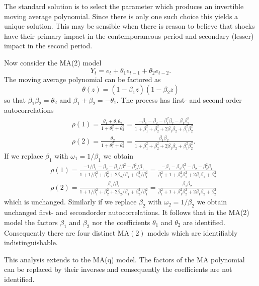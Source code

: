 \documentclass[10pt]{article}
\begin{document}
The standard solution is to select the parameter which produces an invertible moving average polynomial. Since there is only one such choice this yields a unique solution. This may be sensible when there is reason to believe that shocks have their primary impact in the contemporaneous period and secondary (lesser) impact in the second period.

Now consider the MA(2) model
$$
Y_{t}=e_{t}+\theta_{1} e_{t-1}+\theta_{2} e_{t-2} .
$$
The moving average polynomial can be factored as
$$
\theta(z)=\left(1-\beta_{1} z\right)\left(1-\beta_{2} z\right)
$$
so that $\beta_{1} \beta_{2}=\theta_{2}$ and $\beta_{1}+\beta_{2}=-\theta_{1}$. The process has first- and second-order autocorrelations
$$
\begin{aligned}
&\rho(1)=\frac{\theta_{1}+\theta_{1} \theta_{2}}{1+\theta_{1}^{2}+\theta_{2}^{2}}=\frac{-\beta_{1}-\beta_{2}-\beta_{1}^{2} \beta_{2}-\beta_{1} \beta_{2}^{2}}{1+\beta_{1}^{2}+\beta_{2}^{2}+2 \beta_{1} \beta_{2}+\beta_{1}^{2} \beta_{2}^{2}} \\
&\rho(2)=\frac{\theta_{2}}{1+\theta_{1}^{2}+\theta_{2}^{2}}=\frac{\beta_{1} \beta_{2}}{1+\beta_{1}^{2}+\beta_{2}^{2}+2 \beta_{1} \beta_{2}+\beta_{1}^{2} \beta_{2}^{2}} .
\end{aligned}
$$
If we replace $\beta_{1}$ with $\omega_{1}=1 / \beta_{1}$ we obtain
$$
\begin{aligned}
&\rho(1)=\frac{-1 / \beta_{1}-\beta_{2}-\beta_{2} / \beta_{1}^{2}-\beta_{2}^{2} / \beta_{1}}{1+1 / \beta_{1}^{2}+\beta_{2}^{2}+2 \beta_{2} / \beta_{1}+\beta_{2}^{2} / \beta_{1}^{2}}=\frac{-\beta_{1}-\beta_{2} \beta_{1}^{2}-\beta_{2}-\beta_{2}^{2} \beta_{1}}{\beta_{1}^{2}+1+\beta_{2}^{2} \beta_{1}^{2}+2 \beta_{2} \beta_{1}+\beta_{2}^{2}} \\
&\rho(2)=\frac{\beta_{2} / \beta_{1}}{1+1 / \beta_{1}^{2}+\beta_{2}^{2}+2 \beta_{2} / \beta_{1}+\beta_{2}^{2} / \beta_{1}^{2}}=\frac{\beta_{1} \beta_{2}}{\beta_{1}^{2}+1+\beta_{1}^{2} \beta_{2}^{2}+2 \beta_{1} \beta_{2}+\beta_{2}^{2}}
\end{aligned}
$$
which is unchanged. Similarly if we replace $\beta_{2}$ with $\omega_{2}=1 / \beta_{2}$ we obtain unchanged first- and secondorder autocorrelations. It follows that in the MA(2) model the factors $\beta_{1}$ and $\beta_{2}$ nor the coefficients $\theta_{1}$ and $\theta_{2}$ are identified. Consequently there are four distinct $\mathrm{MA}(2)$ models which are identifiably indistinguishable.

This analysis extends to the MA(q) model. The factors of the MA polynomial can be replaced by their inverses and consequently the coefficients are not identified.
\end{document}
